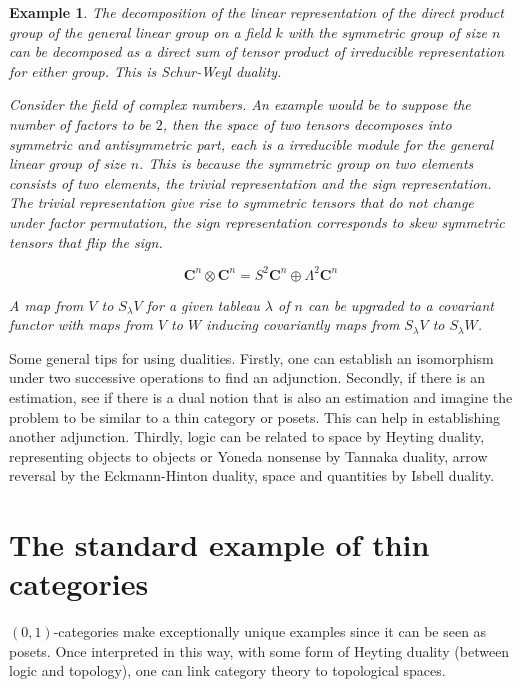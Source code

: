 \documentclass{tufte-book}
\newtheorem{example}[theorem]{Example}
\begin{document}
 \begin{example}
 	The decomposition of the linear representation of the direct product group of the general linear group on a field $k$ with the symmetric group of size $n$ can be decomposed as a direct sum of tensor product of irreducible representation for either group. This is Schur-Weyl duality.
 
 	Consider the field of complex numbers.
 	An example would be to suppose the number of factors to be $2$, then the space of two tensors decomposes into symmetric and antisymmetric part, each is a irreducible module for the general linear group of size $n$. This is because the symmetric group on two elements consists of two elements, the trivial representation and the sign representation. The trivial representation give rise to symmetric tensors that do not change under factor permutation, the sign representation corresponds to skew symmetric tensors that flip the sign.
 
 	\begin{equation}
 		\mathbf{C}^n \otimes \mathbf{C}^n
 		= S^2 \mathbf{C}^n \oplus \Lambda^2 \mathbf{C}^n
 	\end{equation}
 
 	A map from $V$ to $S_\lambda V$ for a given tableau $\lambda$ of $n$ can be upgraded to a covariant functor with maps from $V$ to $W$ inducing covariantly maps from $S_\lambda V$ to $S_\lambda W$.
 \end{example}
 
 Some general tips for using dualities. Firstly, one can establish an isomorphism under two successive operations to find an adjunction. Secondly, if there is an estimation, see if there is a dual notion that is also an estimation and imagine the problem to be similar to a thin category or posets. This can help in establishing another adjunction. Thirdly, logic can be related to space by Heyting duality, representing objects to objects or Yoneda nonsense by Tannaka duality, arrow reversal by the Eckmann-Hinton duality, space and quantities by Isbell duality.

 \section{The standard example of thin categories}

$(0,1)$-categories make exceptionally unique examples since it can be seen as posets. Once interpreted in this way, with some form of Heyting duality (between logic and topology), one can link category theory to topological spaces.
 
\end{document}
